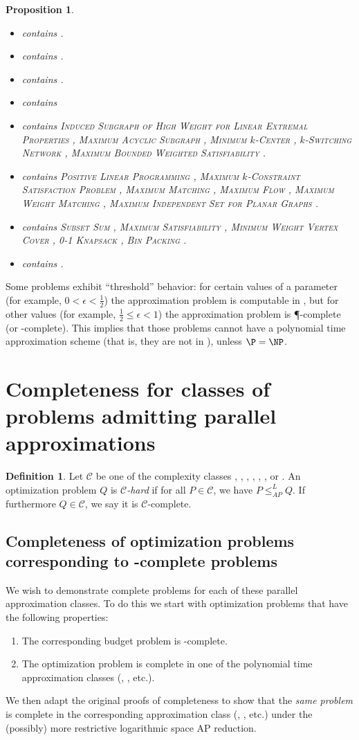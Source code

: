 \documentclass[]{article}
\theoremstyle{plain}
\newtheorem{proposition}{Proposition}
\theoremstyle{definition}
\newtheorem{definition}{Definition}
\newcommand{\APr}{\leq_{AP}^{L}}
\newcommand{\apxncoproblems}{%
  \textsc{Induced Subgraph of High Weight for Linear Extremal Properties} \cite{dsst97},
  \textsc{Maximum Acyclic Subgraph} \cite[Section~7.4]{dsst97},
  \textsc{Minimum $k$-Center} \cite[Section~7.4]{dsst97},
  \textsc{$k$-Switching Network} \cite[Section~7.4]{dsst97},
  \textsc{Maximum Bounded Weighted Satisfiability} \cite[Theorem~4]{sx95}}
\newcommand{\expapxncoproblems}{}
\newcommand{\fncasproblems}{%
  \textsc{Subset Sum} \cite[Theorem~4.1.4]{dsst97},
  \textsc{Maximum Satisfiability} \cite[Theorem~8]{trevisan98},
  \textsc{Minimum Weight Vertex Cover} \cite[Theorem~5.3.6]{dsst97},
  \textsc{0-1 Knapsack} \cite[Theorem~2]{mayr88},
  \textsc{Bin Packing} \cite[Theorem~3]{mayr88}}
\newcommand{\logapxncoproblems}{}
\newcommand{\ncasproblems}{%
  \textsc{Positive Linear Programming} \cite[Theorem~5.1.11]{dsst97},
  \textsc{Maximum $k$-Constraint Satisfaction Problem} \cite[Corollary~13]{trevisan98},
  \textsc{Maximum Matching} \cite[Theorem~5.2.1]{dsst97},
  \textsc{Maximum Flow} \cite[Theorem~5.2.2]{dsst97},
  \textsc{Maximum Weight Matching} \cite[Theorem~5.2.2]{dsst97},
  \textsc{Maximum Independent Set for Planar Graphs} \cite[Theorem 6.4.1]{dsst97}}
\newcommand{\ncoproblems}{}
\newcommand{\nncoproblems}{}
\newcommand{\polyapxncoproblems}{}
\begin{document}
\begin{proposition}
  \mbox{}
  \begin{itemize}
  \item \NNCO{} contains \nncoproblems.
  \item \expApxNCO{} contains \expapxncoproblems.
  \item \polyApxNCO{} contains \polyapxncoproblems.
  \item \logApxNCO{} contains \logapxncoproblems
  \item \ApxNCO{} contains \apxncoproblems.
  \item \NCAS{} contains \ncasproblems.
  \item \FNCAS{} contains \fncasproblems.
  \item \NCO{} contains \ncoproblems.
  \end{itemize}
\end{proposition}

Some problems exhibit ``threshold'' behavior: for certain values of a parameter (for example, $0 < \epsilon < \frac{1}{2}$) the approximation problem is computable in \NC, but for other values (for example, $\frac{1}{2} \leq \epsilon < 1$) the approximation problem is \P-complete (or \NP-complete).
This implies that those problems cannot have a polynomial time approximation scheme (that is, they are not in \PTAS), unless $\P = \NP$.

\section{Completeness for classes of problems admitting parallel approximations}
\label{sec:completeness}

\begin{definition}
  Let $\mathcal{C}$ be one of the complexity classes \NCO, \NCAS, \ApxNCO, \logApxNCO, \polyApxNCO, \expApxNCO, or \NNCO.
  An optimization problem $Q$ is \emph{$\mathcal{C}$-hard} if for all $P\in\mathcal{C}$, we have $P\APr Q$.
  If furthermore $Q\in\mathcal{C}$, we say it is $\mathcal{C}$-complete.
\end{definition}

\subsection{Completeness of optimization problems corresponding to \texorpdfstring{\NP}{NP}-complete problems}

We wish to demonstrate complete problems for each of these parallel approximation classes.
To do this we start with optimization problems that have the following properties:
\begin{enumerate}
\item The corresponding budget problem is \NP-complete.
\item The optimization problem is complete in one of the polynomial time approximation classes (\ApxPO, \PTAS, etc.).
\end{enumerate}
We then adapt the original proofs of completeness to show that the \emph{same problem} is complete in the corresponding \NC{} approximation class (\ApxNCO, \NCAS, etc.) under the (possibly) more restrictive logarithmic space AP reduction.
\end{document}
